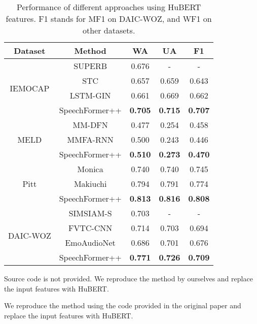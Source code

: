 \documentclass[lettersize,journal]{IEEEtran}
\begin{document}
\begin{table}[t]
    \caption{Performance of different approaches using HuBERT features. F1 stands for MF1 on DAIC-WOZ, and WF1 on other datasets.
    }
    \label{tab_hubert}
    \centering
    \begin{threeparttable}
    \begin{tabular}{c||c||ccc}
    \hline
    Dataset                   & Method  & WA   & UA  & F1   \\ \hline
    \multirow{4}{*}{IEMOCAP}  & SUPERB\cite{superb} & 0.676 & - & -  \\
                              & \tnote{}\; STC\cite{stc} & 0.657	& 0.659	& 0.643  \\
                              & \tnote{}\; LSTM-GIN\cite{LSTM-GIN} & 0.661 & 0.669 & 0.662 \\ \cline{2-5}
                              & SpeechFormer++ & \textbf{0.705} & \textbf{0.715} & \textbf{0.707}  \\ \hline
    \multirow{3}{*}{MELD}     & \tnote{}\; MM-DFN\cite{MM-DFN}  & 0.477 & 0.254 & 0.458 \\
                              & \tnote{}\; MMFA-RNN\cite{MMFA-RNN} & 0.500 & 0.243 & 0.446\\ \cline{2-5}
                              & SpeechFormer++ & \textbf{0.510} & \textbf{0.273} & \textbf{0.470}  \\ \hline
    \multirow{3}{*}{Pitt}     & Monica\cite{Monica} & 0.740 & 0.740 & 0.745  \\
                              & \tnote{}\; Makiuchi\cite{Makiuchi} & 0.794 & 0.791 & 0.774  \\ \cline{2-5}
                              & SpeechFormer++ & \textbf{0.813} & \textbf{0.816} & \textbf{0.808}  \\ \hline
    \multirow{4}{*}{DAIC-WOZ} & SIMSIAM-S\cite{daic_use_hubert} & 0.703 & - & -  \\
                              & \tnote{}\; FVTC-CNN\cite{FVTC-CNN} & 0.714 & 0.703 & 0.694  \\
                              & \tnote{}\; EmoAudioNet\cite{EmoAudioNet} & 0.686 & 0.701 & 0.676  \\ \cline{2-5}
                              & SpeechFormer++ & \textbf{0.771} & \textbf{0.726} & \textbf{0.709}  \\ \hline
    \end{tabular}
    \begin{tablenotes}
        \footnotesize
        \item[] Source code is not provided. We reproduce the method by ourselves and replace the input features with HuBERT.
        \item[] We reproduce the method using the code provided in the original paper and replace the input features with HuBERT.
    \end{tablenotes}
    \end{threeparttable}
\end{table}
\end{document}
